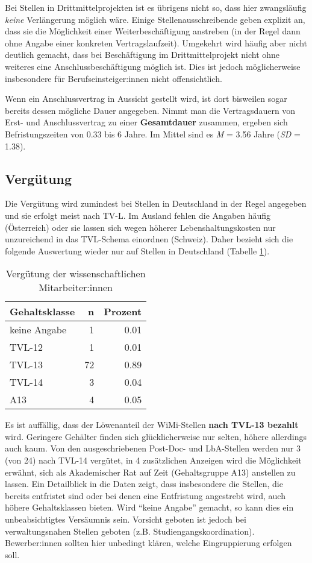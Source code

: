 \documentclass[
]{article}
\begin{document}
Bei Stellen in Drittmittelprojekten ist es übrigens nicht so, dass hier zwangsläufig \emph{keine} Verlängerung möglich wäre. Einige Stellenausschreibende geben explizit an, dass sie die Möglichkeit einer Weiterbeschäftigung anstreben (in der Regel dann ohne Angabe einer konkreten Vertragslaufzeit). Umgekehrt wird häufig aber nicht deutlich gemacht, dass bei Beschäftigung im Drittmittelprojekt nicht ohne weiteres eine Anschlussbeschäftigung möglich ist. Dies ist jedoch möglicherweise insbesondere für Berufseinsteiger:innen nicht offensichtlich.

Wenn ein Anschlussvertrag in Aussicht gestellt wird, ist dort bisweilen sogar bereits dessen mögliche Dauer angegeben. Nimmt man die Vertragsdauern von Erst- und Anschlussvertrag zu einer \textbf{Gesamtdauer} zusammen, ergeben sich Befristungszeiten von 0.33 bis 6 Jahre. Im Mittel sind es \emph{M} = 3.56 Jahre (\emph{SD} = 1.38).

\hypertarget{verguxfctung}{%
\subsection{Vergütung}\label{verguxfctung}}

Die Vergütung wird zumindest bei Stellen in Deutschland in der Regel angegeben und sie erfolgt meist nach TV-L. Im Ausland fehlen die Angaben häufig (Österreich) oder sie lassen sich wegen höherer Lebenshaltungskosten nur unzureichend in das TVL-Schema einordnen (Schweiz). Daher bezieht sich die folgende Auswertung wieder nur auf Stellen in Deutschland (Tabelle \ref{tab:wimipay}).

\begin{table}[H]

\caption{\label{tab:wimipay}Vergütung der wissenschaftlichen Mitarbeiter:innen}
\centering
\begin{tabular}[t]{l|r|r}
\hline
Gehaltsklasse & n & Prozent\\
\hline
keine Angabe & 1 & 0.01\\
\hline
TVL-12 & 1 & 0.01\\
\hline
TVL-13 & 72 & 0.89\\
\hline
TVL-14 & 3 & 0.04\\
\hline
A13 & 4 & 0.05\\
\hline
\end{tabular}
\end{table}

Es ist auffällig, dass der Löwenanteil der WiMi-Stellen \textbf{nach TVL-13 bezahlt} wird. Geringere Gehälter finden sich glücklicherweise nur selten, höhere allerdings auch kaum. Von den ausgeschriebenen Post-Doc- und LbA-Stellen werden nur 3 (von 24) nach TVL-14 vergütet, in 4 zusätzlichen Anzeigen wird die Möglichkeit erwähnt, sich als Akademischer Rat auf Zeit (Gehaltsgruppe A13) anstellen zu lassen. Ein Detailblick in die Daten zeigt, dass insbesondere die Stellen, die bereits entfristet sind oder bei denen eine Entfristung angestrebt wird, auch höhere Gehaltsklassen bieten. Wird ``keine Angabe'' gemacht, so kann dies ein unbeabsichtigtes Versäumnis sein. Vorsicht geboten ist jedoch bei verwaltungsnahen Stellen geboten (z.B. Studiengangskoordination). Bewerber:innen sollten hier unbedingt klären, welche Eingruppierung erfolgen soll.
\end{document}
